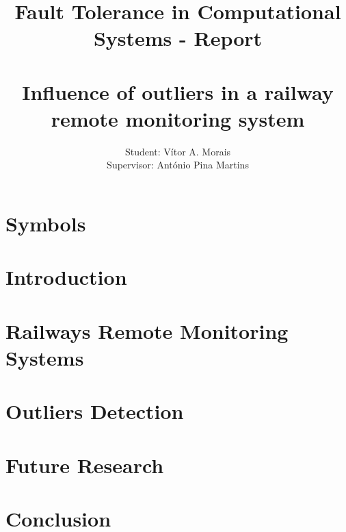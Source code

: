\documentclass{report}%
\title{\vspace{-3.5cm} Fault Tolerance in Computational Systems - Report \\
\hrulefill\\
 Influence of outliers in a railway remote monitoring system%
}
\author{Student: Vítor A. Morais\\
Supervisor: António Pina Martins }
\begin{document}
\maketitle



\tableofcontents


\printnomenclature

\chapter*{Symbols}


\chapter{Introduction}



\chapter{Railways Remote Monitoring Systems}


\chapter{Outliers Detection}


\chapter{Future Research}


\chapter{Conclusion}





%
%
\end{document}
